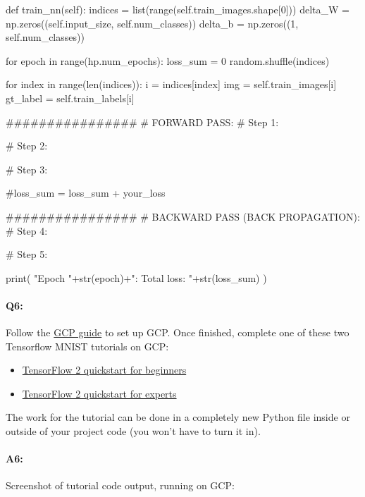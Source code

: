 \pagebreak
\begin{python}
def train_nn(self):
    indices = list(range(self.train_images.shape[0]))
    delta_W = np.zeros((self.input_size, self.num_classes))
    delta_b = np.zeros((1, self.num_classes))

    for epoch in range(hp.num_epochs):
	   loss_sum = 0
        random.shuffle(indices)

        for index in range(len(indices)):
            i = indices[index]
            img = self.train_images[i]
            gt_label = self.train_labels[i]

            ################
            # FORWARD PASS:
            # Step 1:

            # Step 2:

            # Step 3:
                
            #loss_sum = loss_sum + your_loss
                
            ################
            # BACKWARD PASS (BACK PROPAGATION):            
            # Step 4:                

            # Step 5:
                
       print( "Epoch "+str(epoch)+": Total loss: "+str(loss_sum) )
\end{python}


\pagebreak
\paragraph{Q6:} Follow the \href{https://cs.brown.edu/courses/csci1430/proj4/gcp-guide/}{GCP guide} to set up GCP. Once finished, complete one of these two Tensorflow MNIST tutorials on GCP:
\begin{itemize}
	\item \href{https://www.tensorflow.org/tutorials/quickstart/beginner}{TensorFlow 2 quickstart for beginners}
	\item \href{https://www.tensorflow.org/tutorials/quickstart/advanced}{TensorFlow 2 quickstart for experts}
\end{itemize}

The work for the tutorial can be done in a completely new Python file inside or outside of your project code (you won't have to turn it in).

\paragraph{A6:} Screenshot of tutorial code output, running on GCP:





